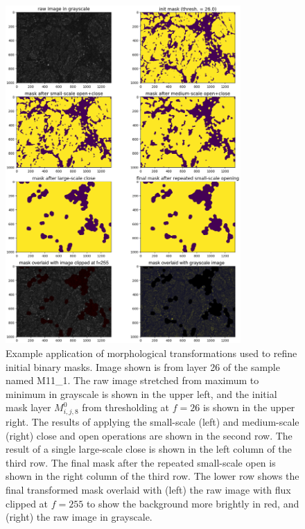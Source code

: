 \documentclass[letterpaper,11pt]{article}
\begin{document}
\begin{figure}[!ht]
\centering
\includegraphics[width=0.80\textwidth]{images/masking/image_110_layer_26_masks}
\caption{\footnotesize Example application of morphological transformations used to refine initial binary masks. Image shown is from layer 26 of the sample named M11\_1. The raw image stretched from maximum to minimum in grayscale is shown in the upper left, and the initial mask layer $M^{0}_{i,j,8}$ from thresholding at $f=26$ is shown in the upper right. The results of applying the small-scale (left) and medium-scale (right) close and open operations are shown in the second row. The result of a single large-scale close is shown in the left column of the third row. The final mask after the repeated small-scale open is shown in the right column of the third row. The lower row shows the final transformed mask overlaid with (left) the raw image with flux clipped at $f=255$ to show the background more brightly in red, and (right) the raw image in grayscale.}
\label{fig:mask_example_min}
\end{figure}
\end{document}
